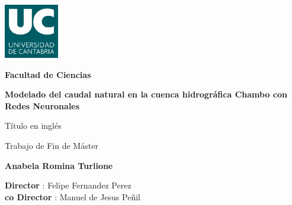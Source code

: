 \begin{titlepage}
\begin{center}

\includegraphics[height=2.38cm]{imagenes/logo_uc.png}
\vspace{0.4cm}

\textbf{Facultad de Ciencias}

\vspace{1cm}

\LARGE
\textbf{Modelado del caudal natural en la cuenca hidrográfica Chambo con Redes Neuronales}

Título en inglés

\vspace{1.cm}
Trabajo de Fin de Máster


\vspace{0.5cm}
\textbf{Anabela Romina Turlione}

\vspace{0.3cm}
\small
\textbf{Director }: Felipe Fernandez Perez\\
\textbf{co Director }: Manuel de Jesus Peñil




\end{center}


        


\end{titlepage}